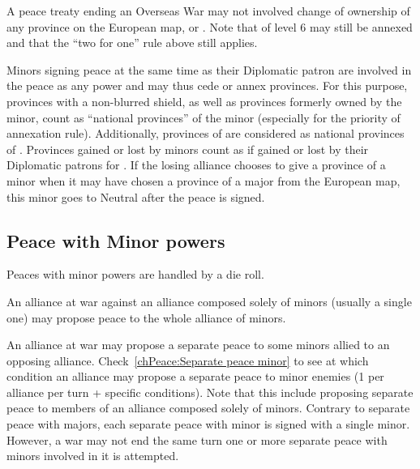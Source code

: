 A peace treaty ending an Overseas War may not involved change of ownership of
any province on the European map,  or .
\bparag Note that \COL of level 6 may still be annexed and that the ``two for
one'' rule above still applies.

\bparag Minors signing peace at the same time as their Diplomatic patron are
involved in the peace as any power and may thus cede or annex provinces.
\bparag For this purpose, provinces with a non-blurred shield, as well as
provinces formerly owned by the minor, count as ``national provinces'' of the
minor (especially for the priority of annexation rule).
\bparag Additionally, provinces of \regionBalkans are considered as national
provinces of \paysVenise.
\bparag Provinces gained or lost by minors count as if gained or lost by their
Diplomatic patrons for \VPs.
\bparag If the losing alliance chooses to give a province of a minor when it
may have chosen a province of a major from the European map, this minor goes
to Neutral after the peace is signed.

\subsection{Peace with Minor powers}\label{chPeace:Peace with Minors}
\aparag Peaces with minor powers are handled by a die roll.

 An alliance at war against an alliance composed solely
of minors (usually a single one) may propose peace to the whole alliance of
minors.

 An alliance at war may propose a separate peace to
some minors allied to an opposing alliance.
\bparag Check~\ref{chPeace:Separate peace minor} to see at which condition an
alliance may propose a separate peace to minor enemies (1 per alliance per
turn + specific conditions).
\bparag Note that this include proposing separate peace to members of an
alliance composed solely of minors.
\bparag Contrary to separate peace with majors, each separate peace with minor
is signed with a single minor. However, a war may not end the same turn one or
more separate peace with minors involved in it is attempted.

